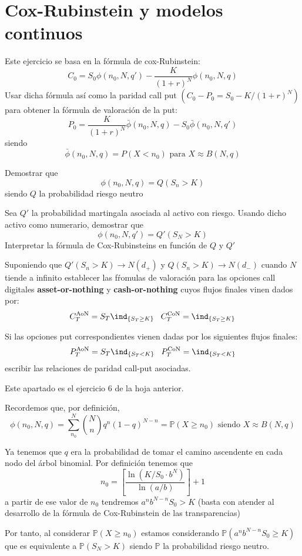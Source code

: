 \section{Cox-Rubinstein y modelos continuos}
\begin{problem}[1]
Este ejercicio se basa en la fórmula de cox-Rubinstein:
\[C_0 = S_0 \phi(n_0, N,q') - \frac{K}{(1+r)^N}\phi(n_0,N,q)\]
\ppart Usar dicha fórmula así como la paridad call put $(C_0-P_0=S_0-K/(1+r)^N)$ para obtener la fórmula de valoración de la put:
\[P_0=\frac{K}{(1+r)^N}\bar{\phi}(n_0,N,q)-S_0\bar{\phi}(n_0,N,q')\]
siendo
\[\bar{\phi}(n_0,N,q)=P(X<n_0) \text{ para } X \approx B(N,q)\]

\ppart Demostrar que
\[\phi(n_0,N,q)=Q(S_n>K)\]
siendo $Q$ la probabilidad riesgo neutro

\ppart Sea $Q'$ la probabilidad martingala asociada al activo con riesgo. Usando dicho activo como numerario, demostrar que
\[\phi(n_0,N,q') = Q'(S_N>K)\]
Interpretar la fórmula de Cox-Rubinsteins en función de $Q$ y $Q'$

\ppart Suponiendo que $Q'(S_n>K)\to N(d_+)$ y $Q(S_n>K)\to N(d_-)$ cuando $N$ tiende a infinito establecer las fŕomulas de valoración para las opciones call digitales \textbf{asset-or-nothing} y \textbf{cash-or-nothing} cuyos flujos finales vinen dados por:
\[C_T^{\text{AoN}}=S_T\ind_{\{S_T\geq K\}}\;\;\; C_T^{\text{CoN}}=\ind_{\{S_T\geq K\}}\]

\ppart Si las opciones put correspondientes vienen dadas por los siguientes flujos finales:
\[P_T^{\text{AoN}}=S_T\ind_{\{S_T< K\}}\;\;\; P_T^{\text{CoN}}=\ind_{\{S_T<K\}}\]
escribir las relaciones de paridad call-put asociadas.
\solution


\spart

Este apartado es el ejercicio 6 de la hoja anterior.

\spart

Recordemos que, por definición,
\[\phi(n_0,N,q) = \sum_{n_0}^N{N \choose n} q^n(1-q)^{N-n} = \mathbb{P}(X\geq n_0) \text{ siendo } X\approx B(N,q)\]

Ya tenemos que $q$ era la probabilidad de tomar el camino ascendente en cada nodo del árbol binomial. Por definición tenemos que
\[n_0 = \left[\frac{\ln (K/S_0\cdot b^N)}{\ln(a/b)} \right] +1\]
a partir de ese valor de $n_0$ tendremos $a^nb^{N-n}S_0 > K$ (basta con atender al desarrollo de la fórmula de Cox-Rubinstein de las transparencias)

Por tanto, al considerar $\mathbb{P}(X\geq n_0)$ estamos considerando $\mathbb{P}(a^nb^{N-n}S_0\geq K)$ que es equivalente a $\mathbb{P}(S_N>K)$ siendo $\mathbb{P}$ la probabilidad riesgo neutro.


\end{problem}
